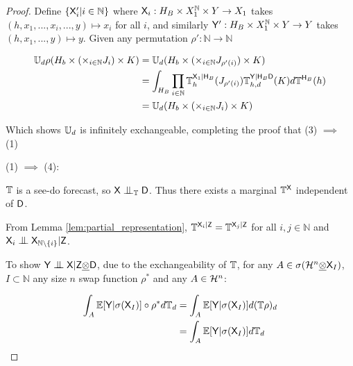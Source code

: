 \begin{proof}
Define $\{\mathsf{X}'_i|i\in \mathbb{N}\}$ where $\mathsf{X}_i:H_B\times X_1^{\mathbb{N}}\times Y\to X_1$ takes $(h,x_1,...,x_i,...,y)\mapsto x_i$ for all $i$, and similarly $\mathsf{Y}':H_B\times X_1^{\mathbb{N}}\times Y\to Y$ takes $(h, x_1,...,y)\mapsto y$. Given any permutation $\rho':\mathbb{N}\to\mathbb{N}$

\begin{align}
    \mathbb{U}_d\rho(H_b \times (\times_{i\in \mathbb{N}}J_{i})\times K)&= \mathbb{U}_d(H_b \times (\times_{i\in \mathbb{N}}J_{\rho'(i)})\times K)\\
    &= \int_{H_B} \prod_{i\in \mathbb{N}} \mathbb{T}^{\mathsf{X}_1|\mathsf{H}_B}_h(J_{\rho'(i)}) \mathbb{T}_{h,d}^{\mathsf{Y}|\mathsf{H}_B\mathsf{D}}(K)d\mathbb{T}^{\mathsf{H}_B}(h)\\
    &= \mathbb{U}_d(H_b \times (\times_{i\in \mathbb{N}}J_{i})\times K)
\end{align}

Which shows $\mathbb{U}_d$ is infinitely exchangeable, completing the proof that (3) $\implies$ (1)


(1) $\implies$ (4):

$\mathbb{T}$ is a see-do forecast, so $\RV{X}\CI_{\kernel{T}}\RV{D}$. Thus there exists a marginal $\mathbb{T}^{\mathsf{X}}$ independent of $\mathsf{D}$.

From Lemma \ref{lem:partial_representation}, $\mathbb{T}^{\mathsf{X}_i|\mathsf{Z}}=\mathbb{T}^{\mathsf{X}_j|\mathsf{Z}}$ for all $i,j\in \mathbb{N}$ and $\RV{X}_i\CI\RV{X}_{\mathbb{N}\setminus\{i\}} |\RV{Z}$.

To show $\RV{Y}\CI\RV{X}|\RV{Z}\utimes\RV{D}$, due to the exchangeability of $\mathbb{T}$, for any $A\in \sigma(\mathcal{H}^n\underline{\otimes}\mathsf{X}_I)$, $I\subset\mathbb{N}$ any size $n$ swap function $\rho^*$ and any $A\in\mathcal{H}^n$:

\begin{align}
    \int_A \mathbb{E}[\mathsf{Y}|\sigma(\mathsf{X}_I)] \circ \rho^* d\mathbb{T}_d &= \int_A \mathbb{E}[\mathsf{Y}|\sigma(\mathsf{X}_I)] d(\mathbb{T}\rho)_d\\
                                                                                       &= \int_A \mathbb{E}[\mathsf{Y}|\sigma(\mathsf{X}_I)] d\mathbb{T}_d
\end{align}




\end{proof}
